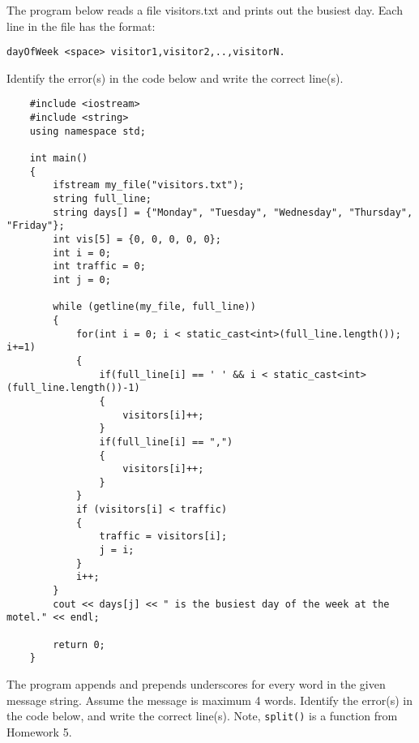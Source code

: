 \newpage

\begin{multipart}
The program below reads a file visitors.txt and prints out the busiest day. Each line in the file has the format:

\texttt{dayOfWeek <space> visitor1,visitor2,..,visitorN.}

Identify the error(s) in the code below and write the correct line(s).
\end{multipart}

\begin{verbatim}
    #include <iostream>
    #include <string>
    using namespace std;
    
    int main()
    {
        ifstream my_file("visitors.txt"); 
        string full_line;
        string days[] = {"Monday", "Tuesday", "Wednesday", "Thursday", "Friday"};
        int vis[5] = {0, 0, 0, 0, 0}; 
        int i = 0;
        int traffic = 0;
        int j = 0;
    
        while (getline(my_file, full_line))
        {
            for(int i = 0; i < static_cast<int>(full_line.length()); i+=1) 
            {
                if(full_line[i] == ' ' && i < static_cast<int>(full_line.length())-1)
                {
                    visitors[i]++;
                }
                if(full_line[i] == ",") 
                {
                    visitors[i]++;
                }
            }
            if (visitors[i] < traffic) 
            {
                traffic = visitors[i];
                j = i;
            }
            i++;
        }
        cout << days[j] << " is the busiest day of the week at the motel." << endl;
    
        return 0;
    }
\end{verbatim}

\newpage

\begin{multipart}
 The program appends and prepends underscores for every word in the given message string. Assume the message is maximum 4 words. Identify the error(s) in the code below, and write the correct line(s). Note, \texttt{split()} is a function from Homework 5.
\end{multipart}

